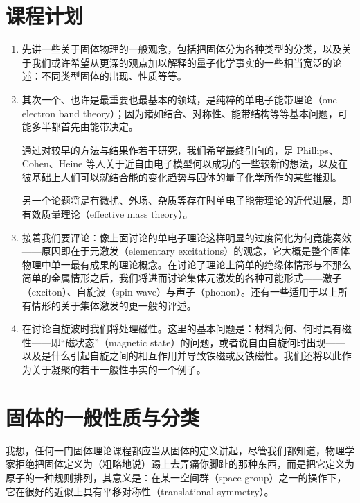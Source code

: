 \section{课程计划}

\begin{enumerate}[label=\arabic*.,leftmargin=2.5em,itemsep=0.4em,parsep=0pt]
\item 先讲一些关于固体物理的一般观念，包括把固体分为各种类型的分类，以及关于我们或许希望从更深的观点加以解释的量子化学事实的一些相当宽泛的论述：不同类型固体的出现、性质等等。

\item 其次一个、也许是最重要也最基本的领域，是纯粹的单电子能带理论（one-electron band theory）；因为诸如结合、对称性、能带结构等等基本问题，可能多半都首先由能带决定。

  通过对较早的方法与结果作若干研究，我们希望最终引向的，是 Phillips、Cohen、Heine 等人关于近自由电子模型何以成功的一些较新的想法，以及在彼基础上人们可以就结合能的变化趋势与固体的量子化学所作的某些推测。

  另一个论题将是有微扰、外场、杂质等存在时单电子能带理论的近代进展，即有效质量理论（effective mass theory）。

\item 接着我们要评论：像上面讨论的单电子理论这样明显的过度简化为何竟能奏效——原因即在于元激发（elementary excitations）的观念，它大概是整个固体物理中单一最有成果的理论概念。在讨论了理论上简单的绝缘体情形与不那么简单的金属情形之后，我们将进而讨论集体元激发的各种可能形式——激子（exciton）、自旋波（spin wave）与声子（phonon）。还有一些适用于以上所有情形的关于集体激发的更一般的评述。

\item 在讨论自旋波时我们将处理磁性。这里的基本问题是：材料为何、何时具有磁性——即“磁状态”（magnetic state）的问题，或者说自由自旋何时出现——以及是什么引起自旋之间的相互作用并导致铁磁或反铁磁性。我们还将以此作为关于凝聚的若干一般性事实的一个例子。
\end{enumerate}

\section{固体的一般性质与分类}

我想，任何一门固体理论课程都应当从固体的定义讲起，尽管我们都知道，物理学家拒绝把固体定义为（粗略地说）踢上去弄痛你脚趾的那种东西，而是把它定义为原子的一种规则排列，其意义是：在某一空间群（space group）之一的操作下，它在很好的近似上具有平移对称性（translational symmetry）。

